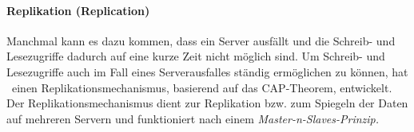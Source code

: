 \paragraph{Replikation (Replication)}\label{replication}
Manchmal kann es dazu kommen, dass ein Server ausfällt und die Schreib- und Lesezugriffe dadurch auf eine kurze Zeit nicht möglich sind. Um Schreib- und Lesezugriffe auch im Fall eines Serverausfalles ständig ermöglichen zu können, hat \mongo\ einen Replikationsmechanismus, basierend auf das CAP-Theorem, entwickelt. Der Replikationsmechanismus dient zur Replikation bzw. zum Spiegeln der Daten auf mehreren Servern und funktioniert nach einem \textit{Master-n-Slaves-Prinzip.}

